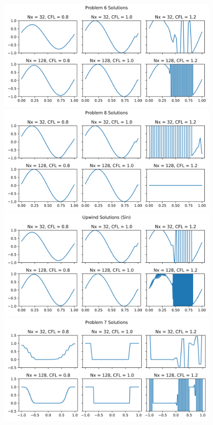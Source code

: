 \documentclass{article}
\begin{document}
\begin{figure}[t]
    \centering
        \centering
        \includegraphics[width=\textwidth]{../code/prob6_tstop.png}
        \includegraphics[width=\textwidth]{../code/prob8_tstop.png}
        \includegraphics[width=\textwidth]{../code/upwind_sin_tstop.png}
    \emp
        \centering
        \includegraphics[width=\textwidth]{../code/prob7_tstop.png}

\end{figure}
\end{document}
